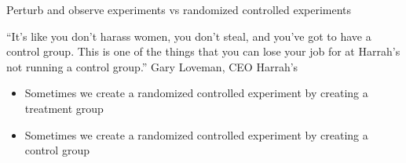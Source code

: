 \documentclass[aspectratio=169]{beamer}
\begin{document}
\begin{frame}

Perturb and observe experiments vs randomized controlled experiments

\end{frame}
\begin{frame}

``It's like you don't harass women, you don't steal, and you've got to have a control group. This is one of the things that you can lose your job for at Harrah's not running a control group.''
Gary Loveman, CEO Harrah's

\end{frame}
\begin{frame}

\begin{itemize}
\item Sometimes we create a randomized controlled experiment by creating a treatment group 
\item Sometimes we create a randomized controlled experiment by creating a control group
\end{itemize}

\end{frame}
\end{document}
